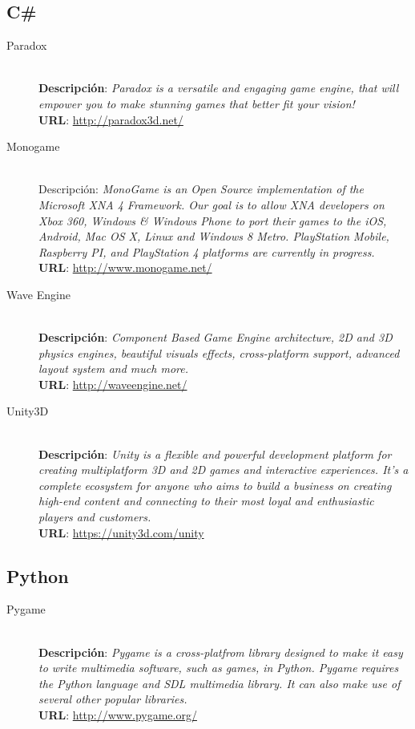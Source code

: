 \subsection{C\#}
\begin{description}
\item[Paradox] \hfill \\
\textbf{Descripción}: \emph{Paradox is a versatile and engaging game engine, that will empower you to make stunning games that better fit your vision!} \\
\textbf{URL}: \url{http://paradox3d.net/}
\item[Monogame] \hfill \\
Descripción: \emph{MonoGame is an Open Source implementation of the Microsoft XNA 4 Framework. Our goal is to allow XNA developers on Xbox 360, Windows \& Windows Phone to port their games to the iOS, Android, Mac OS X, Linux and Windows 8 Metro. PlayStation Mobile, Raspberry PI, and PlayStation 4 platforms are currently in progress.} \\
\textbf{URL}: \url{http://www.monogame.net/}
\item[Wave Engine] \hfill \\
\textbf{Descripción}: \emph{Component Based Game Engine architecture, 2D and 3D physics engines, beautiful visuals effects, cross-platform support, advanced layout system and much more.} \\
\textbf{URL}: \url{http://waveengine.net/}
\item[Unity3D] \hfill \\
\textbf{Descripción}: \emph{Unity is a flexible and powerful development platform for creating multiplatform 3D and 2D games and interactive experiences. It's a complete ecosystem for anyone who aims to build a business on creating high-end content and connecting to their most loyal and enthusiastic players and customers.} \\
\textbf{URL}: \url{https://unity3d.com/unity}
\end{description}

\subsection{Python}
\begin{description}
\item[Pygame] \hfill \\
\textbf{Descripción}: \emph{Pygame is a cross-platfrom library designed to make it easy to write multimedia software, such as games, in Python. Pygame requires the Python language and SDL multimedia library. It can also make use of several other popular libraries.} \\
\textbf{URL}: \url{http://www.pygame.org/}
\end{description}

